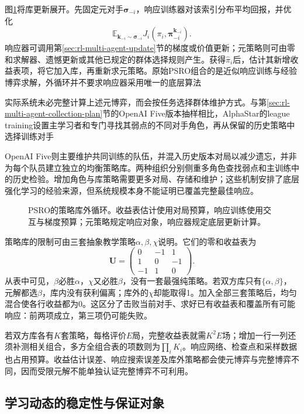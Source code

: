 图\ref{fig:rl-multi-agent-psro}将库更新展开。先固定元对手$\bm\sigma_{-i}$，响应训练器对该索引分布平均回报，并优化
\[
 \mathbb E_{\bm k_{-i}\sim\bm\sigma_{-i}}
       J_i(\pi_i,\bm\pi_{-i}^{\bm k_{-i}}).
\]
响应器可调用第\ref{sec:rl-multi-agent-update}节的梯度或价值更新；元策略则可由零和求解器、遗憾更新或其他已规定的群体选择规则产生。获得$\hat\pi_i$后，估计其新增收益表项，将它加入库，再重新求元策略。原始PSRO组合的是近似响应训练与经验博弈求解，外循环并不要求响应器采用唯一的底层算法

实际系统未必完整计算上述元博弈，而会按任务选择群体维护方式。与第\ref{sec:rl-multi-agent-collection-plan}节的OpenAI Five版本抽样相比，AlphaStar的league training设置主学习者和专门寻找其弱点的不同对手角色，再从保留的历史策略中选择训练对手

OpenAI Five则主要维护共同训练的队伍，并混入历史版本对局以减少遗忘，并非为每个队员建立独立的均衡策略库。两种组织分别侧重多角色查找弱点和主训练中的历史检验。增加角色与库策略需要更多对局、存储和维护；这些机制安排了底层强化学习的经验来源，但系统规模本身不能证明已覆盖完整最佳响应。

\begin{figure}[htbp]
 \centering
 
 \caption{PSRO的策略库外循环。收益表估计使用对局预算，响应训练使用交互与梯度预算；元策略规定响应对象，响应器规定底层更新计算。}
 \label{fig:rl-multi-agent-psro}
\end{figure}

策略库的限制可由三套抽象教学策略$\alpha,\beta,\chi$说明。它们的零和收益表为
\[
 \bm U=
 \begin{pmatrix}0&-1&1\\1&0&-1\\-1&1&0\end{pmatrix}.
\]
从表中可见，$\beta$必胜$\alpha$，$\chi$又必胜$\beta$，没有一套最强纯策略。若双方库只有$\{\alpha,\beta\}$，元解都选$\beta$，库内没有获利偏离；库外的$\chi$却能取得1。加入全部三套策略后，均匀混合使各行收益都为0。这区分了击败当前对手、求好已有收益表和覆盖所有可能响应：前两项成立，第三项仍可能失败。

若双方库各有$K$套策略，每格评价$E$局，完整收益表就需$K^2E$场；增加一行一列还须补测相关组合，多方全组合表的项数则为$\prod_iK_i$。响应网络、检查点和采样数据也占用预算。收益估计误差、响应搜索误差及库外策略都会使元博弈与完整博弈不同，因而受限元解不能单独认证完整博弈不可利用。

\subsection{学习动态的稳定性与保证对象}
\label{sec:rl-multi-agent-stability}

